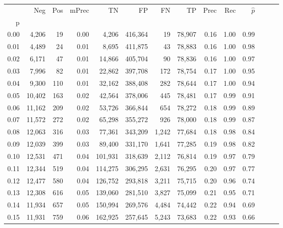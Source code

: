 \begin{tabular}{rrrrrrrrrrrrrr}
\toprule
{} &     Neg &    Pos & mPrec &       TN &       FP &      FN &      TP &  Prec &   Rec & $\hat{p}$ \\
p    &         &        &       &          &          &         &         &       &       &           \\
\midrule
0.00 &   4,206 &     19 &  0.00 &    4,206 &  416,364 &      19 &  78,907 &  0.16 &  1.00 &      0.99 \\
0.01 &   4,489 &     24 &  0.01 &    8,695 &  411,875 &      43 &  78,883 &  0.16 &  1.00 &      0.98 \\
0.02 &   6,171 &     47 &  0.01 &   14,866 &  405,704 &      90 &  78,836 &  0.16 &  1.00 &      0.97 \\
0.03 &   7,996 &     82 &  0.01 &   22,862 &  397,708 &     172 &  78,754 &  0.17 &  1.00 &      0.95 \\
0.04 &   9,300 &    110 &  0.01 &   32,162 &  388,408 &     282 &  78,644 &  0.17 &  1.00 &      0.94 \\
0.05 &  10,402 &    163 &  0.02 &   42,564 &  378,006 &     445 &  78,481 &  0.17 &  0.99 &      0.91 \\
0.06 &  11,162 &    209 &  0.02 &   53,726 &  366,844 &     654 &  78,272 &  0.18 &  0.99 &      0.89 \\
0.07 &  11,572 &    272 &  0.02 &   65,298 &  355,272 &     926 &  78,000 &  0.18 &  0.99 &      0.87 \\
0.08 &  12,063 &    316 &  0.03 &   77,361 &  343,209 &   1,242 &  77,684 &  0.18 &  0.98 &      0.84 \\
0.09 &  12,039 &    399 &  0.03 &   89,400 &  331,170 &   1,641 &  77,285 &  0.19 &  0.98 &      0.82 \\
0.10 &  12,531 &    471 &  0.04 &  101,931 &  318,639 &   2,112 &  76,814 &  0.19 &  0.97 &      0.79 \\
0.11 &  12,344 &    519 &  0.04 &  114,275 &  306,295 &   2,631 &  76,295 &  0.20 &  0.97 &      0.77 \\
0.12 &  12,477 &    580 &  0.04 &  126,752 &  293,818 &   3,211 &  75,715 &  0.20 &  0.96 &      0.74 \\
0.13 &  12,308 &    616 &  0.05 &  139,060 &  281,510 &   3,827 &  75,099 &  0.21 &  0.95 &      0.71 \\
0.14 &  11,934 &    657 &  0.05 &  150,994 &  269,576 &   4,484 &  74,442 &  0.22 &  0.94 &      0.69 \\
0.15 &  11,931 &    759 &  0.06 &  162,925 &  257,645 &   5,243 &  73,683 &  0.22 &  0.93 &      0.66 \\

\end{tabular}
